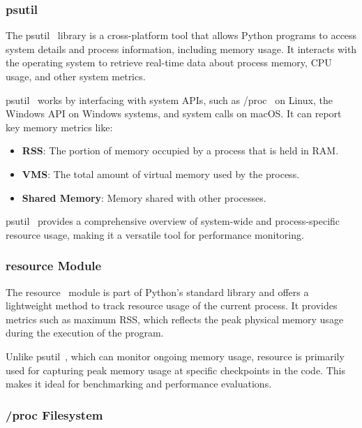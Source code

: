 \subsubsection{psutil}

The psutil~\cite{psutil} library is a cross-platform tool that allows Python programs to access system details and process information, including memory usage.
It interacts with the operating system to retrieve real-time data about process memory, \ac{CPU} usage, and other system metrics.

psutil~\cite{psutil} works by interfacing with system APIs, such as /proc~\cite{procfs} on Linux, the Windows \ac{API} on Windows systems, and system calls on \ac{macOS}.
It can report key memory metrics like:

\begin{itemize}
    \item \textbf{\ac{RSS}}:
    The portion of memory occupied by a process that is held in \ac{RAM}.

    \item \textbf{\ac{VMS}}:
    The total amount of virtual memory used by the process.

    \item \textbf{Shared Memory}:
    Memory shared with other processes.
\end{itemize}

psutil~\cite{psutil} provides a comprehensive overview of system-wide and process-specific resource usage, making it a versatile tool for performance monitoring.

\subsubsection{resource Module}

The resource~\cite{importlib_resources} module is part of Python's standard library and offers a lightweight method to track resource usage of the current process.
It provides metrics such as maximum \ac{RSS}, which reflects the peak physical memory usage during the execution of the program.

Unlike psutil~\cite{psutil}, which can monitor ongoing memory usage, resource is primarily used for capturing peak memory usage at specific checkpoints in the code.
This makes it ideal for benchmarking and performance evaluations.

\subsubsection{/proc Filesystem}

